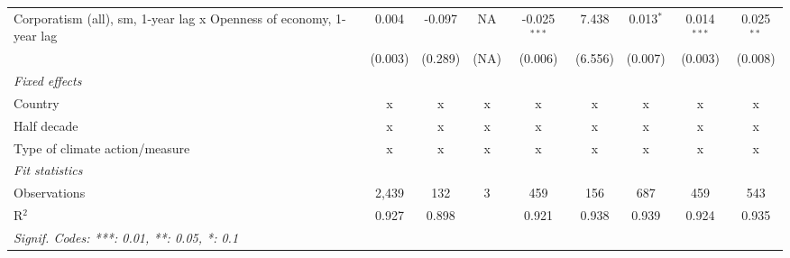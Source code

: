 \begin{table}[htbp]
\begin{tabular}{lcccccccc}
      Corporatism (all), sm, 1-year lag x Openness of economy, 1-year lag & 0.004         & -0.097                    & NA           & -0.025$^{***}$ & 7.438            & 0.013$^{*}$     & 0.014$^{***}$   & 0.025$^{**}$\\   
                                                                          & (0.003)       & (0.289)                   & (NA)         & (0.006)        & (6.556)          & (0.007)         & (0.003)         & (0.008)\\   
      \emph{Fixed effects}\\
      Country                                                             & x             & x                         & x            & x              & x                & x               & x               & x\\  
      Half decade                                                         & x             & x                         & x            & x              & x                & x               & x               & x\\  
      Type of climate action/measure                                      & x             & x                         & x            & x              & x                & x               & x               & x\\  
      \midrule \emph{Fit statistics}\\
      Observations                                                        & 2,439         & 132                       & 3            & 459            & 156              & 687             & 459             & 543\\  
      R$^2$                                                               & 0.927         & 0.898                     &              & 0.921          & 0.938            & 0.939           & 0.924           & 0.935\\  
      \midrule
      \multicolumn{9}{l}{\emph{Signif. Codes: ***: 0.01, **: 0.05, *: 0.1}}\\
   \end{tabular}
\end{table}


